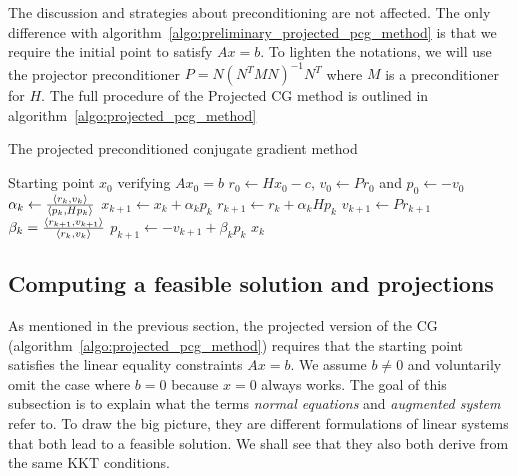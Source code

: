 \documentclass[10pt]{article}
\numberwithin{equation}{section}
\begin{document}
	 The discussion and strategies about preconditioning are not affected. The only difference with algorithm~\eqref{algo:preliminary_projected_pcg_method} is that we require the initial point to satisfy $Ax=b$. To lighten the notations, we will use the projector preconditioner $P= N(N^TMN)^{-1}N^T$ where $M$ is a preconditioner for $H$. The full procedure of the Projected CG method is outlined in algorithm~\ref{algo:projected_pcg_method} 
	 
	 \begin{algorithm}
	 	\caption{The projected preconditioned conjugate gradient method}\label{algo:projected_pcg_method}
	 	\begin{algorithmic}
	 		\Require Starting point $x_0$ verifying $Ax_0=b$
	 		\State $r_0 \gets Hx_0-c$, $v_0\gets Pr_0$ and $p_0 \gets -v_0$
	 		\State $\alpha_k \gets \frac{\left\langle {r_k} , {v_k} \right\rangle}{\left\langle {p_k} , {Hp_k} \right\rangle}$
	 		\State $x_{k+1} \gets x_k+\alpha_kp_k$
	 		\State $r_{k+1} \gets r_k + \alpha_kHp_k$
	 		\State $v_{k+1}\gets Pr_{k+1}$
	 		\State $\beta_k =  \frac{\left\langle {r_{k+1}} , {v_{k+1}} \right\rangle}{\left\langle {r_k} , {v_k} \right\rangle}$
	 		\State $p_{k+1} \gets -v_{k+1}+\beta_kp_k$
	 		\EndFor{}
	 		\Return $x_k$
	 	\end{algorithmic}
	 \end{algorithm} 
	 
	 \subsection{Computing a feasible solution and projections}\label{subsec:cg_feasible_solution}
	 
	 As mentioned in the previous section, the projected version of the CG (algorithm~\ref{algo:projected_pcg_method}) requires that the starting point satisfies the linear equality constraints $Ax=b$. We assume $b\neq0$ and voluntarily omit the case where $b=0$ because $x=0$ always works. The goal of this subsection is to explain what the terms \textit{normal equations} and \textit{augmented system} refer to. To draw the big picture, they are different formulations of linear systems that both lead to a feasible solution. We shall see that they also both derive from the same KKT conditions.
	 
\end{document}
